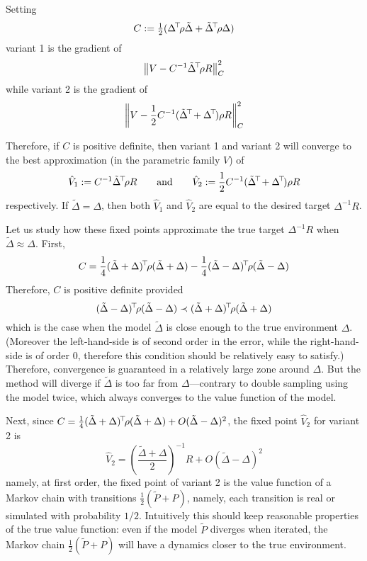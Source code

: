 \documentclass[11pt,a4paper]{article}
\begin{document}
Setting
\begin{equation}
C\mathrel{\mathop{:}}= \tfrac12 (\Delta^{\!\top}\!\rho \tilde \Delta+\tilde
\Delta^{\!\top}\!\rho\Delta)
\end{equation}
variant 1 is the gradient of
\begin{equation}
\left\lVert V-C^{-1}\tilde\Delta^{\!\top}\!\rho R\right\rVert^2_C
\end{equation}
while variant 2 is the gradient of
\begin{equation}
\left\lVert V-\frac12 C^{-1}(\tilde\Delta^{\!\top}\!+\Delta^{\!\top}\!)\rho R\right\rVert^2_C
\end{equation}

Therefore, if $C$ is positive definite, then variant 1 and variant 2 will converge to
the best approximation (in the parametric family $V$) of
\begin{equation}
\hat V_1\mathrel{\mathop{:}}= C^{-1}\tilde\Delta^{\!\top}\!\rho R \qquad\text{and}\qquad \hat
V_2\mathrel{\mathop{:}}= \frac12
C^{-1}(\tilde\Delta^{\!\top}\!+\Delta^{\!\top}\!)\rho R
\end{equation}
respectively.
If $\tilde \Delta=\Delta$, then both $\hat V_1$ and $\hat V_2$
are equal to the desired target
$\Delta^{-1}R$.

Let us study how these fixed points approximate the true target
$\Delta^{-1}R$ when $\tilde \Delta \approx \Delta$. First,
\begin{equation}
C=\frac14 (\tilde \Delta+\Delta)^{\!\top}\!\rho(\tilde \Delta+\Delta)-\frac14
(\tilde
\Delta-\Delta)^{\!\top}\!\rho(\tilde
\Delta-\Delta)
\end{equation}
Therefore, $C$ is positive definite provided
\begin{equation}
(\tilde
\Delta-\Delta)^{\!\top}\!\rho(\tilde
\Delta-\Delta)\prec (\tilde \Delta+\Delta)^{\!\top}\!\rho(\tilde \Delta+\Delta)
\end{equation}
which is the case when the model $\tilde \Delta$ is close enough
to the true environment $\Delta$. (Moreover the left-hand-side is of
second order in the error, while the right-hand-side is of order $0$,
therefore this condition should be relatively easy to satisfy.) Therefore, convergence is guaranteed in a relatively large
zone around $\Delta$. But the method will diverge if $\tilde \Delta$ is
too far from $\Delta$—contrary to double sampling using the model twice,
which always converges to the value function of the model.

Next, since $C=\frac14 (\tilde \Delta+\Delta)^{\!\top}\!\rho(\tilde
\Delta+\Delta)+O(\tilde\Delta-\Delta)^2$, the fixed point $\hat V_2$ for variant 2
is
\begin{equation}
\hat V_2=\left(\frac{\tilde
\Delta+\Delta}{2}\right)^{-1}R+O(\tilde\Delta-\Delta)^2
\end{equation}
namely, at first order, the fixed point of variant 2 is the value
function of a Markov chain with transitions $\tfrac12(\tilde P+P)$,
namely, each transition is real or simulated with probability $1/2$.
Intuitively this should keep reasonable properties of the true value
function: even if the model $\tilde P$ diverges when iterated, the Markov chain $\tfrac12(\tilde
P+P)$ will have a dynamics closer to the true environment.
\end{document}
